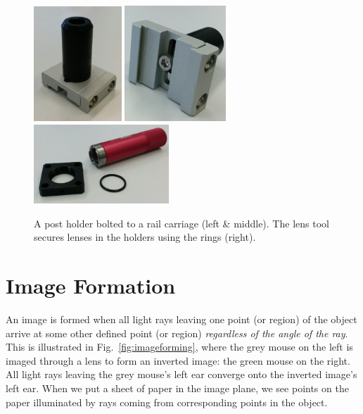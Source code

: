 \documentclass[a4paper]{report}
\begin{document}
\begin{figure}[h]
\center
\includegraphics[width=1.3in]{post_mounted.eps}
\includegraphics[width=1.5in]{post_mounted_underside.eps}
\includegraphics[width=2in]{lens_tool.eps}
\caption{A post holder bolted to a rail carriage (left \& middle).
The lens tool secures lenses in the holders using the rings (right).}
\label{fig:post}
\end{figure}


\clearpage

\section{Image Formation}
An image is formed when all light rays leaving one point (or region) of the object arrive at some other defined point (or region) \textit{regardless of the angle of the ray}. 
This is illustrated in Fig.~\ref{fig:imageforming}, where the grey mouse on the left is imaged through a lens to form an inverted image: the green mouse on the right. 
All light rays leaving the grey mouse's left ear converge onto the inverted image's left ear. 
When we put a sheet of paper in the image plane, we see points on the paper illuminated by rays coming from corresponding points in the object. 
\end{document}
